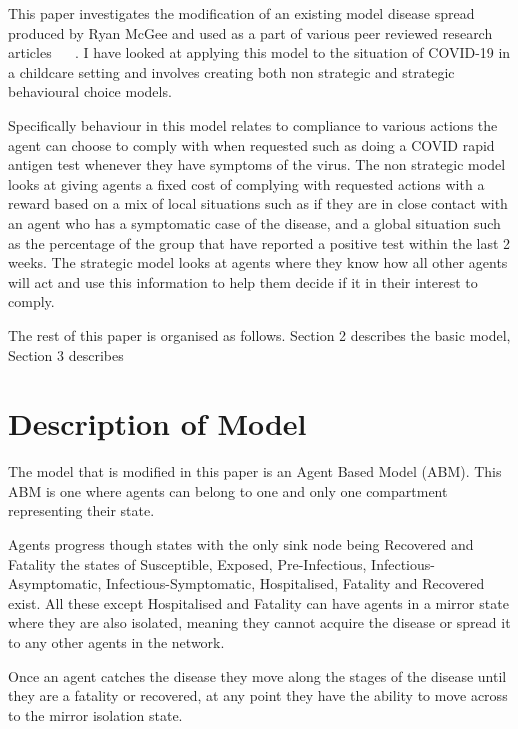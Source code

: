 \documentclass{article}
\begin{document}
This paper investigates the modification of an existing model disease spread produced by Ryan McGee and used as a part of various peer reviewed research articles ~\cite{mcgee_homburger_williams_bergstrom_zhou_2021} ~\cite{mcgee_homburger_williams_bergstrom_zhou_2021_2}. 
I have looked at applying this model to the situation of COVID-19 in a childcare setting and involves creating both non strategic and strategic behavioural choice models. 

Specifically behaviour in this model relates to compliance to various actions the agent can choose to comply with when requested such as doing a COVID rapid antigen test whenever they have symptoms of the virus. The non strategic model looks at giving agents a fixed cost of complying with requested actions with a reward based on a mix of local situations such as if they are in close contact with an agent who has a symptomatic case of the disease, and a global situation such as the percentage of the group that have reported a positive test within the last 2 weeks. The strategic model looks at agents where they know how all other agents will act and use this information to help them decide if it in their interest to comply.


The rest of this paper is organised as follows. 
Section 2 describes the basic model, Section 3 describes 




\section{Description of Model \label{description}}
The model that is modified in this paper is an Agent Based Model (ABM). This ABM is one where agents can belong to one and only one compartment representing their state. 

Agents progress though states with the only sink node being Recovered and Fatality
the states of Susceptible, Exposed, Pre-Infectious, Infectious-Asymptomatic, Infectious-Symptomatic, Hospitalised, Fatality and Recovered exist. All these except Hospitalised and Fatality can have agents in a mirror state where they are also isolated, meaning they cannot acquire the disease or spread it to any other agents in the network.

Once an agent catches the disease they move along the stages of the disease until they are a fatality or recovered, at any point they have the ability to move across to the mirror isolation state. 
\end{document}
